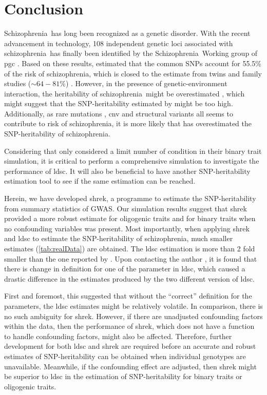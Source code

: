 \documentclass[12pt]{scrbook}
\newcommand*{\scz}{schizophrenia}
\newcommand*{\Scz}{Schizophrenia}
\begin{document}
\chapter{Conclusion}
\label{conclusionChapter}
\glsresetall
\Scz\ has long been recognized as a genetic disorder. 
With the recent advancement in technology, 108 independent genetic loci associated with \scz\ has finally been identified by the \Scz\ Working group of \gls{pgc} \citep{Ripke2014}.
Based on these results, \citet{Bulik-Sullivan2015} estimated that the common \glspl{SNP} account for 55.5\% of the risk of \scz, which is closed to the estimate from twins and family studies ($\sim64-81\%$) \citep{sullivan2003schizophrenia,Lichtenstein2009}.
However, in the presence of genetic-environment interaction, the heritability of \scz\ might be overestimated \citep{zuk2012mystery}, which might suggest that the \gls{SNP}-heritability estimated by \citet{Bulik-Sullivan2015} might be too high. 
Additionally, as rare mutations \citep{purcell2014polygenic}, \gls{cnv} \citep{Szatkiewicz2014} and structural variants \citep{Walsh2008} all seems to contribute to risk of \scz,  it is more likely that \citet{Bulik-Sullivan2015} has overestimated the \gls{SNP}-heritability of \scz.

Considering that \citet{Bulik-Sullivan2015} only considered a limit number of condition in their binary trait simulation, it is critical to perform a comprehensive simulation to investigate the performance of \gls{ldsc}.
It will also be beneficial to have another \gls{SNP}-heritability estimation tool to see if the same estimation can be reached. 

Herein, we have developed \gls{shrek}, a programme to estimate the \gls{SNP}-heritability from summary statistics of \gls{GWAS}.
Our simulation results suggest that \gls{shrek} provided a more robust estimate for oligogenic traits and for binary traits when no confounding variables was present.
Most importantly, when applying \gls{shrek} and \gls{ldsc} to estimate the \gls{SNP}-heritability of \scz, much smaller estimates (\cref{tab:realData}) are obtained.
The \gls{ldsc} estimation is more than 2 fold smaller than the one reported by \citet{Bulik-Sullivan2015}.
Upon contacting the author \citep{Bulik-Sullivan2015c}, it is found that there is change in definition for one of the parameter in \gls{ldsc}, which caused a drastic difference in the estimates produced by the two different version of \gls{ldsc}.

First and foremost, this suggested that without the ``correct'' definition for the parameters, the \gls{ldsc} estimates might be relatively volatile.
In comparison, there is no such ambiguity for \gls{shrek}.
However, if there are unadjusted confounding factors within the data, then the performance of \gls{shrek}, which does not have a function to handle confounding factors, might also be affected.
Therefore, further development for both \gls{ldsc} and \gls{shrek} are required before an accurate and robust estimates of \gls{SNP}-heritability can be obtained when individual genotypes are unavailable. 
Meanwhile, if the confounding effect are adjusted, then \gls{shrek} might be superior to \gls{ldsc} in the estimation of \gls{SNP}-heritability for binary traits or oligogenic traits. 
\end{document}
